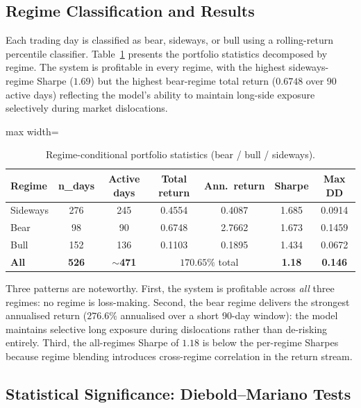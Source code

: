 \subsection{Regime Classification and Results}

Each trading day is classified as bear, sideways, or bull using a rolling-return percentile classifier. Table~\ref{tab:regime_table} presents the portfolio statistics decomposed by regime. The system is profitable in every regime, with the highest sideways-regime Sharpe ($1.69$) but the highest bear-regime total return ($0.6748$ over 90 active days) reflecting the model's ability to maintain long-side exposure selectively during market dislocations.

\begin{table}[H]
\centering
\caption{Regime-conditional portfolio statistics (bear / bull / sideways).}
\label{tab:regime_table}
\renewcommand{\arraystretch}{1.35}
\begin{adjustbox}{max width=\textwidth}
\begin{tabular}{l c c c c c c}
\toprule
\textbf{Regime} & \textbf{n\_days} & \textbf{Active days} & \textbf{Total return} & \textbf{Ann.\ return} & \textbf{Sharpe} & \textbf{Max DD} \\
\midrule
Sideways  & 276 & 245 & 0.4554 & 0.4087 & 1.685 & 0.0914 \\
Bear      &  98 &  90 & 0.6748 & 2.7662 & 1.673 & 0.1459 \\
Bull      & 152 & 136 & 0.1103 & 0.1895 & 1.434 & 0.0672 \\
\midrule
\textbf{All} & \textbf{526} & \textbf{$\sim$471} & \multicolumn{2}{c}{$170.65\%$ total} & \textbf{1.18} & \textbf{0.146} \\
\bottomrule
\end{tabular}
\end{adjustbox}
\end{table}

Three patterns are noteworthy. First, the system is profitable across \emph{all} three regimes: no regime is loss-making. Second, the bear regime delivers the strongest annualised return ($276.6\%$ annualised over a short 90-day window): the model maintains selective long exposure during dislocations rather than de-risking entirely. Third, the all-regimes Sharpe of $1.18$ is below the per-regime Sharpes because regime blending introduces cross-regime correlation in the return stream.

\subsection{Statistical Significance: Diebold--Mariano Tests}

